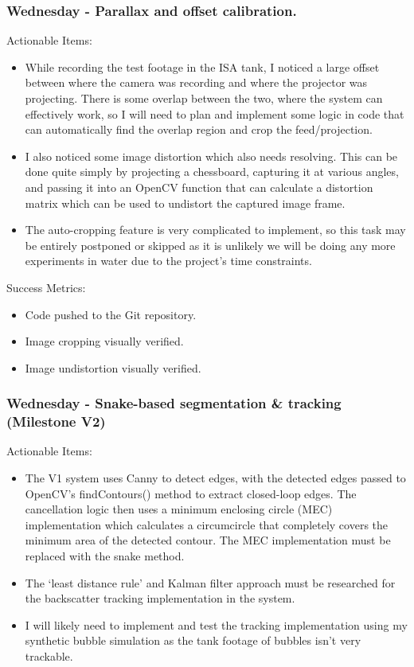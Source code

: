 \subsubsection{Wednesday - Parallax and offset calibration.}

Actionable Items:

\begin{itemize}
    \item While recording the test footage in the ISA tank, I noticed a large offset between where the camera was recording and where the projector was projecting. There is some overlap between the two, where the system can effectively work, so I will need to plan and implement some logic in code that can automatically find the overlap region and crop the feed/projection.
    \item I also noticed some image distortion which also needs resolving. This can be done quite simply by projecting a chessboard, capturing it at various angles, and passing it into an OpenCV function that can calculate a distortion matrix which can be used to undistort the captured image frame.
    \item The auto-cropping feature is very complicated to implement, so this task may be entirely postponed or skipped as it is unlikely we will be doing any more experiments in water due to the project's time constraints.
\end{itemize}

Success Metrics:

\begin{itemize}
    \item Code pushed to the Git repository.
    \item Image cropping visually verified.
    \item Image undistortion visually verified.
\end{itemize}



\subsubsection{Wednesday - Snake-based segmentation \& tracking (Milestone V2)}

Actionable Items:

\begin{itemize}
    \item The V1 system uses Canny to detect edges, with the detected edges passed to OpenCV's findContours() method to extract closed-loop edges. The cancellation logic then uses a minimum enclosing circle (MEC) implementation which calculates a circumcircle that completely covers the minimum area of the detected contour. The MEC implementation must be replaced with the snake method.
    \item The `least distance rule' and Kalman filter approach must be researched for the backscatter tracking implementation in the system.
    \item I will likely need to implement and test the tracking implementation using my synthetic bubble simulation as the tank footage of bubbles isn't very trackable.
\end{itemize}

